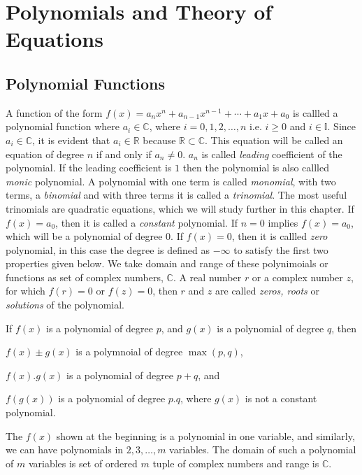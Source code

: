 \chapter{Polynomials and Theory of Equations}
\section{Polynomial Functions}
A function of the form $f(x) = a_nx^n + a_{n - 1}x^{n - 1} + \cdots + a_1x + a_0$ is callled a polynomial
function where $a_i\in\mathbb{C}$, where $i = 0, 1, 2, \ldots, n$ i.e. $i \geq 0$ and
$i\in\mathbb{I}$. Since $a_i\in\mathbb{C}$, it is evident that $a_i\in\mathbb{R}$ because
$\mathbb{R}\subset\mathbb{C}$. This equation will be called an equation of degree $n$ if and only if
$a_n\neq 0$. $a_n$ is called {\it leading} coefficient of the polynomial. If the leading coefficient is $1$
then the polynomial is also callled {\it monic} polynomial. A polynomial with one term is called {\it
  monomial}, with two terms, a {\it binomial} and with three terms it is called a {\it trinomial}. The most
useful trinomials are quadratic equations, which we will study further in this chapter. If $f(x) = a_0$,
then it is called a {\it constant} polynomial. If $n = 0$ implies $f(x) = a_0$, which will be a polynomial
of degree $0$. If $f(x) = 0$, then it is callled {\it zero} polynomial, in this case the degree is defined
as $-\infty$ to satisfy the first two properties given below. We take domain and range of these polynimoials
or functions as set of complex numbers, $\mathbb{C}$. A real number $r$ or a complex number $z$, for which
$f(r) = 0$ or $f(z) = 0$, then $r$ and $z$ are called {\it zeros, roots} or {\it solutions} of the
polynomial.

If $f(x)$ is a polynomial of degree $p$, and $g(x)$ is a polynomial of degree $q$, then

\startitemize[n]
\item $f(x)\pm g(x)$ is a polymnoial of degree $\max(p, q)$,
\item $f(x).g(x)$ is a polynomial of degree $p + q$, and
\item $f(g(x))$ is a polynomial of degree $p.q$, where $g(x)$ is not a constant polynomial.
\stopitemize

The $f(x)$ shown at the beginning is a polynomial in one variable, and similarly, we can have polynomials in
$2, 3, \ldots, m$ variables. The domain of such a polynomial of $m$ variables is set of ordered $m$ tuple of
complex numbers and range is $\mathbb{C}$.

